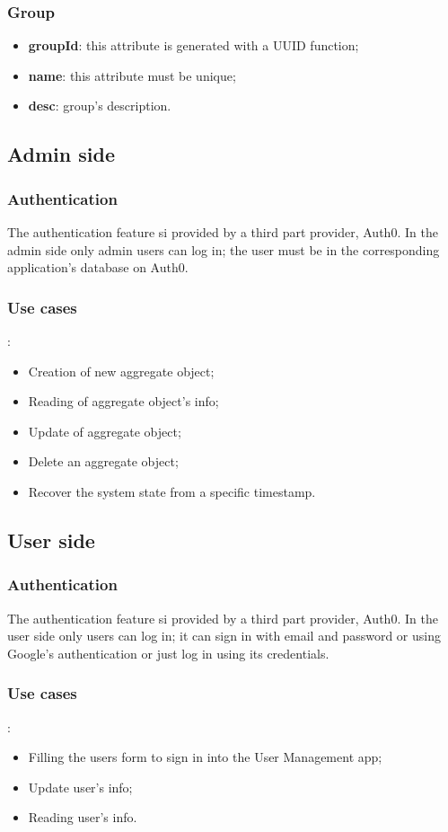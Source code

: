 \subsubsection{Group}
\begin{itemize}
	\item \textbf{groupId}: this attribute is generated with a UUID function;
	\item \textbf{name}: this attribute must be unique;
	\item \textbf{desc}: group's description.
\end{itemize}

\subsection{Admin side}
\subsubsection{Authentication}
The authentication feature si provided by a third part provider, Auth0. In the admin side only admin users can log in; the user must be in the corresponding application's database on Auth0.
\subsubsection{Use cases}:
\begin{itemize}
	\item Creation of new aggregate object;
	\item Reading of aggregate object's info;
	\item Update of aggregate object;
	\item Delete an aggregate object;
	\item Recover the system state from a specific timestamp.
\end{itemize}
	

\subsection{User side}
\subsubsection{Authentication}
The authentication feature si provided by a third part provider, Auth0. In the user side only users can log in; it can sign in with email and password or using Google's authentication or just log in using its credentials.
\subsubsection{Use cases}:
\begin{itemize}
	\item Filling the users form to sign in into the User Management app;
	\item Update user's info;
	\item Reading user's info.
\end{itemize}

